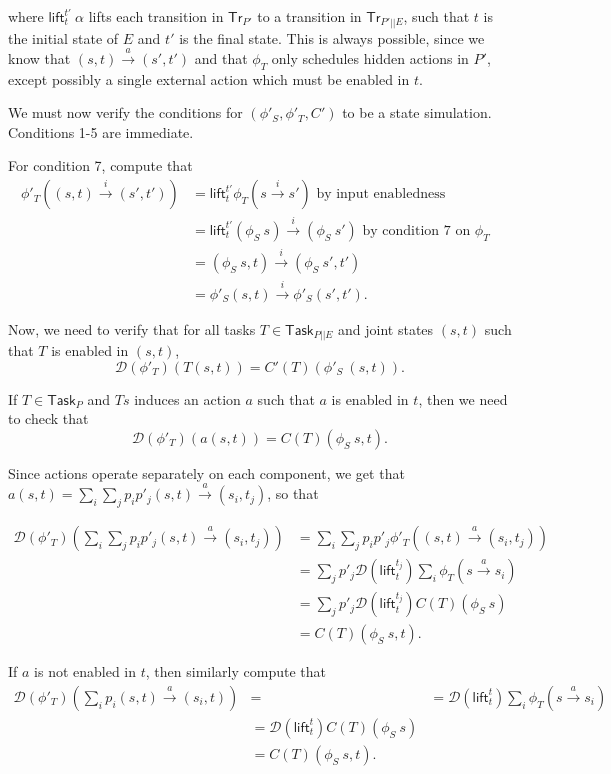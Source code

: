 \documentclass{article}
\newcommand{\Tr}{\mathsf{Tr}}
\newcommand{\Task}{\mathsf{Task}}
\newcommand{\D}{\mathcal{D}}
\begin{document}
where $\mathsf{lift}_t^{t'}\ \alpha$ lifts each transition in $\Tr_{P'}$ to a transition in $\Tr_{P' || E}$, such that $t$ is the initial state of $E$ and $t'$ is the final state. This is always possible, since we know that $(s,t) \xrightarrow{a} (s', t')$ and that $\phi_T$ only schedules hidden actions in $P'$, except possibly a single external action which must be enabled in $t$.

We must now verify the conditions for $(\phi'_S, \phi'_T, C')$ to be a state simulation. Conditions 1-5 are immediate. 

For condition 7, compute that
\begin{align*}
    \phi'_T ((s,t) \xrightarrow{i} (s',t')) &= \mathsf{lift}_t^{t'} \phi_T (s \xrightarrow{i} s') \text{ by input enabledness } \\
     &= \mathsf{lift}_t^{t'} (\phi_S\ s) \xrightarrow{i} (\phi_S\ s') \text{ by condition 7 on $\phi_T$ } \\
     &= (\phi_S\ s, t) \xrightarrow{i} (\phi_S\ s', t') \\
     &= \phi'_S (s,t) \xrightarrow{i} \phi'_S (s', t').
 \end{align*}

Now, we need to verify that for all tasks $T \in \Task_{P || E}$ and joint states $(s,t)$ such that $T$ is enabled in $(s,t)$, 
\[\D(\phi'_T)(T(s,t)) = C'(T) (\phi'_S\ (s,t)).\]

If $T \in \Task_P$ and $Ts$ induces an action $a$ such that $a$ is enabled in $t$, then we need to check that
\[\D(\phi'_T)(a (s,t)) = C(T) (\phi_S\ s, t).\]

Since actions operate separately on each component, we get that $a (s,t) = \sum_i \sum_j p_i p'_j (s,t) \xrightarrow{a} (s_i, t_j)$, so that

\begin{align*}
    \D(\phi'_T)(\sum_i \sum_j p_i p'_j (s,t) \xrightarrow{a} (s_i, t_j)) &=
         \sum_i \sum_j p_i p'_j \phi'_T ((s,t) \xrightarrow{a} (s_i, t_j)) \\
      &= \sum_j p'_j \D(\mathsf{lift}_t^{t_j}) \sum_i \phi_T (s \xrightarrow{a} s_i) \\
      &= \sum_j p'_j \D(\mathsf{lift}_t^{t_j}) C(T) (\phi_S\ s) \\
      &= C(T) (\phi_S\ s, t).
\end{align*}

If $a$ is not enabled in $t$, then similarly compute that
\begin{align*}
    \D(\phi'_T)(\sum_i p_i (s,t) \xrightarrow{a} (s_i, t)) &=
      &= \D(\mathsf{lift}_t^{t}) \sum_i \phi_T (s \xrightarrow{a} s_i) \\
      &= \D(\mathsf{lift}_t^{t}) C(T) (\phi_S\ s) \\
      &= C(T) (\phi_S\ s, t).
\end{align*}
\end{document}
